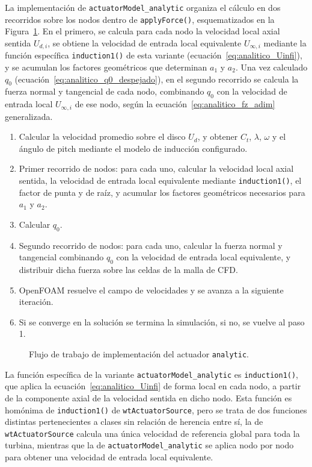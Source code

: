 La implementación de \texttt{actuatorModel\_analytic} organiza el cálculo en dos recorridos sobre los nodos dentro de \texttt{applyForce()}, esquematizados en la Figura~\ref{fig:impl_analitico}. En el primero, se calcula para cada nodo la velocidad local axial sentida $U_{d,i}$, se obtiene la velocidad de entrada local equivalente $U_{\infty,i}$ mediante la función específica \texttt{induction1()} de esta variante (ecuación~\ref{eq:analitico_Uinfi}), y se acumulan los factores geométricos que determinan $a_1$ y $a_2$. Una vez calculado $q_0$ (ecuación~\ref{eq:analitico_q0_despejado}), en el segundo recorrido se calcula la fuerza normal y tangencial de cada nodo, combinando $q_0$ con la velocidad de entrada local $U_{\infty,i}$ de ese nodo, según la ecuación~\ref{eq:analitico_fz_adim} generalizada.
\begin{enumerate}
\item Calcular la velocidad promedio sobre el disco $U_d$, y obtener $C_t$, $\lambda$, $\omega$ y el ángulo de pitch mediante el modelo de inducción configurado.
\item Primer recorrido de nodos: para cada uno, calcular la velocidad local axial sentida, la velocidad de entrada local equivalente mediante \texttt{induction1()}, el factor de punta y de raíz, y acumular los factores geométricos necesarios para $a_1$ y $a_2$.
\item Calcular $q_0$.
\item Segundo recorrido de nodos: para cada uno, calcular la fuerza normal y tangencial combinando $q_0$ con la velocidad de entrada local equivalente, y distribuir dicha fuerza sobre las celdas de la malla de CFD.
\item OpenFOAM resuelve el campo de velocidades y se avanza a la siguiente iteración.
\item Si se converge en la solución se termina la simulación, si no, se vuelve al paso 1.
\end{enumerate}
\begin{figure}[h]
\centering
\caption{Flujo de trabajo de implementación del actuador \texttt{analytic}.}
\label{fig:impl_analitico}
\end{figure}

La función específica de la variante \texttt{actuatorModel\_analytic} es \texttt{induction1()}, que aplica la ecuación~\ref{eq:analitico_Uinfi} de forma local en cada nodo, a partir de la componente axial de la velocidad sentida en dicho nodo. Esta función es homónima de \texttt{induction1()} de \texttt{wtActuatorSource}, pero se trata de dos funciones distintas pertenecientes a clases sin relación de herencia entre sí, la de \texttt{wtActuatorSource} calcula una única velocidad de referencia global para toda la turbina, mientras que la de \texttt{actuatorModel\_analytic} se aplica nodo por nodo para obtener una velocidad de entrada local equivalente.


